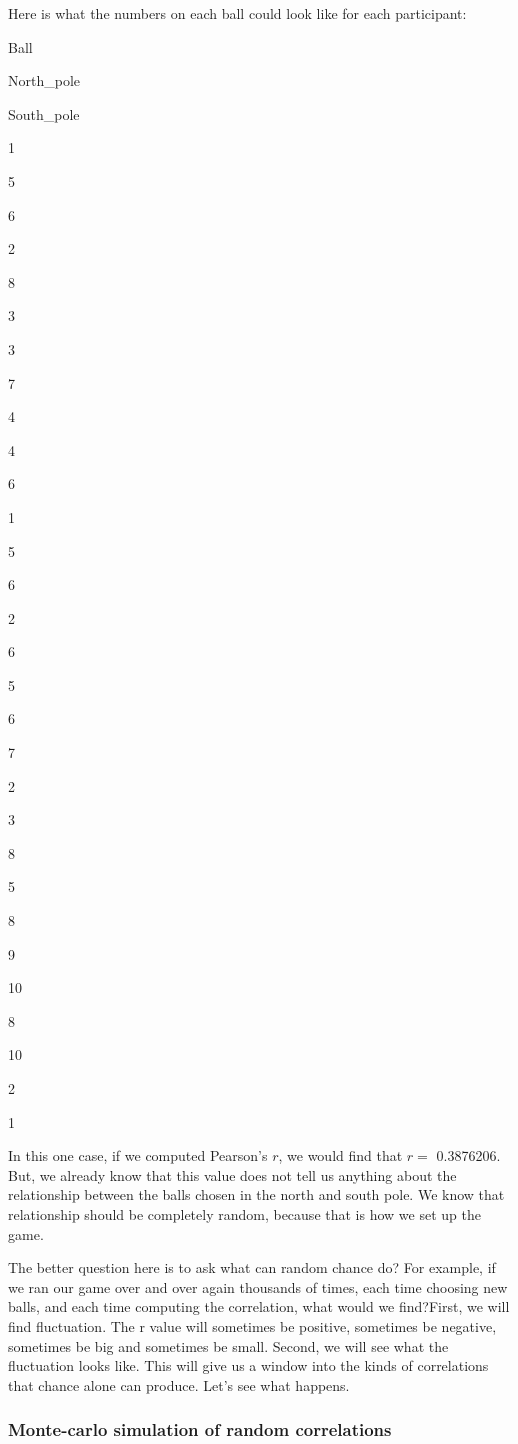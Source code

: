 \documentclass[
]{book}
\begin{document}
Here is what the numbers on each ball could look like for each participant:

Ball

North\_pole

South\_pole

1

5

6

2

8

3

3

7

4

4

6

1

5

6

2

6

5

6

7

2

3

8

5

8

9

10

8

10

2

1

In this one case, if we computed Pearson's \(r\), we would find that \(r =\) 0.3876206. But, we already know that this value does not tell us anything about the relationship between the balls chosen in the north and south pole. We know that relationship should be completely random, because that is how we set up the game.

The better question here is to ask what can random chance do? For example, if we ran our game over and over again thousands of times, each time choosing new balls, and each time computing the correlation, what would we find?First, we will find fluctuation. The r value will sometimes be positive, sometimes be negative, sometimes be big and sometimes be small. Second, we will see what the fluctuation looks like. This will give us a window into the kinds of correlations that chance alone can produce. Let's see what happens.

\hypertarget{monte-carlo-simulation-of-random-correlations}{%
\subsubsection{Monte-carlo simulation of random correlations}\label{monte-carlo-simulation-of-random-correlations}}
\end{document}
